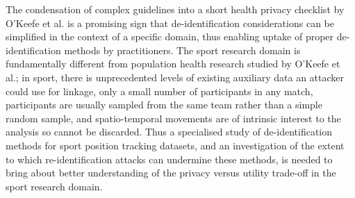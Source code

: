 The condensation of complex guidelines into a short health privacy checklist by O'Keefe et al. \cite{OKeefe2017} is a promising sign that de-identification considerations can be simplified in the context of a specific domain, thus enabling uptake of proper de-identification methods by practitioners. The sport research domain is fundamentally different from population health research studied by O'Keefe et al.; in sport, there is unprecedented levels of existing auxiliary data an attacker could use for linkage, only a small number of participants in any match, participants are usually sampled from the same team rather than a simple random sample, and spatio-temporal movements are of intrinsic interest to the analysis so cannot be discarded. Thus a specialised study of de-identification methods for sport position tracking datasets, and an investigation of the extent to which re-identification attacks can undermine these methods, is needed to bring about better understanding of the privacy versus utility trade-off in the sport research domain.

\pagebreak
